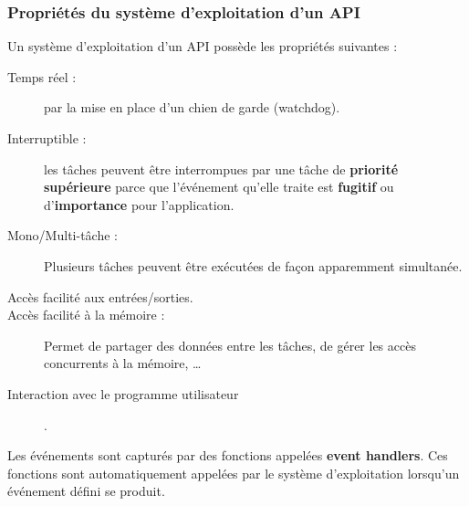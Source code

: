
\subsubsection{Propriétés du système d'exploitation d'un API}
Un système d'exploitation d'un API possède les propriétés suivantes :
\begin{description}
    \item[Temps réel : ] par la mise en place d'un chien de garde (watchdog).
    \item[Interruptible : ] les tâches peuvent être interrompues par une tâche de \textbf{priorité supérieure} parce que l'événement qu'elle traite est \textbf{fugitif} ou d'\textbf{importance} pour l'application.
    \item[Mono/Multi-tâche : ] Plusieurs tâches peuvent être exécutées de façon apparemment simultanée.
    \item[Accès facilité aux entrées/sorties.]
    \item[Accès facilité à la mémoire : ] Permet de partager des données entre les tâches, de gérer les accès concurrents à la mémoire, \dots
    \item[Interaction avec le programme utilisateur].
\end{description}

Les événements sont capturés par des fonctions appelées \textbf{event handlers}. Ces fonctions sont automatiquement appelées par le système d'exploitation lorsqu'un événement défini se produit.


